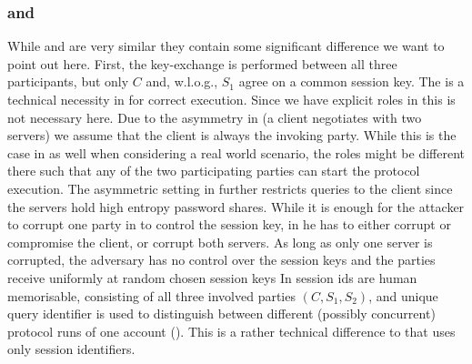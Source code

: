 \subsubsection{\FTWOPAKE and \FPAKE}
While \FPAKE and \FTWOPAKE are very similar they contain some significant difference we want to point out here.
First, the key-exchange is performed between all three participants, but only $C$ and, w.l.o.g., $S_1$ agree on a common session key.
The \role is a technical necessity in \FPAKE for correct execution.
Since we have explicit roles in \FTWOPAKE this is not necessary here.
Due to the asymmetry in \FTWOPAKE (a client negotiates with two servers) we assume that the client is always the invoking party.
While this is the case in \FPAKE as well when considering a real world scenario, the roles might be different there such that any of the two participating parties can start the protocol execution.
The asymmetric setting in \FTWOPAKE further restricts \TestPwd queries to the client since the servers hold high entropy password shares.
While it is enough for the attacker to corrupt one party in \FPAKE to control the session key, in \FTWOPAKE he has to either corrupt or compromise the client, or corrupt both servers.
As long as only one server is corrupted, the adversary has no control over the session 	keys and the parties receive uniformly at random chosen session keys
In \FTWOPAKE session ids are human memorisable, consisting of all three involved parties $(C,S_1,S_2)$, and unique query identifier is used to distinguish between different (possibly concurrent) protocol runs of one account (\sid).
This is a rather technical difference to \FPAKE that uses only session identifiers.

	



